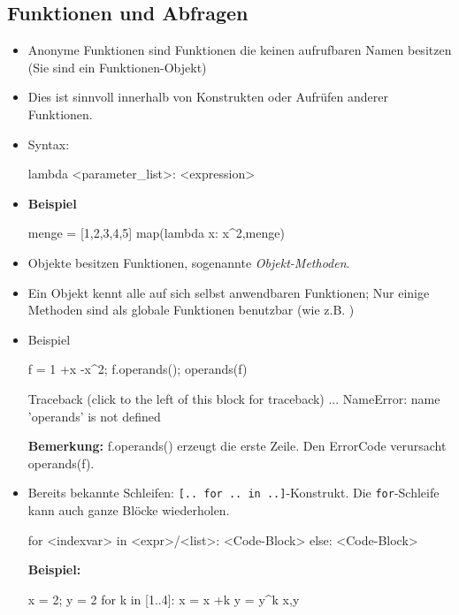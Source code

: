 \documentclass[fontsize=12pt,paper=a4,twoside,bibtotoc,idxtotoc,
liststotoc,pagesize,BCOR1.2cm,DIV15,chapterprefix,pagesize=pdftex]{scrbook}
\begin{document}
\subsection{Funktionen und Abfragen}
\begin{itemize}
\item Anonyme Funktionen sind Funktionen die keinen aufrufbaren Namen besitzen (Sie sind ein Funktionen-Objekt)
\item Dies ist sinnvoll innerhalb von Konstrukten oder Aufrüfen anderer Funktionen.
\item Syntax:
\begin{sagein}
lambda <parameter_list>: <expression> 
\end{sagein}
\item \textbf{Beispiel}
\begin{sagein}
menge = [1,2,3,4,5]
map(lambda x: x^2,menge)
\end{sagein}
\begin{sage}
 [1, 4, 9, 16, 25]
\end{sage}
\item Objekte besitzen Funktionen, sogenannte \emph{Objekt-Methoden}. 
\item Ein Objekt kennt alle auf sich selbst anwendbaren Funktionen; Nur einige Methoden sind als globale Funktionen benutzbar (wie z.B. )\newpage
\item Beispiel
 \begin{sagein}
f = 1 +x -x^2; f.operands(); operands(f)
\end{sagein}
\begin{sage}
[-x^2, x, 1]
Traceback (click to the left of this block for traceback)
...
NameError: name 'operands' is not defined
\end{sage}
\textbf{Bemerkung:}\newline
 f.operands() erzeugt die erste Zeile.\newline
 Den ErrorCode verursacht operands(f).
\item Bereits bekannte Schleifen: \verb+[.. for .. in ..]+-Konstrukt. Die \verb+for+-Schleife kann  auch
ganze Blöcke wiederholen.
\begin{sagein}
for <indexvar> in <expr>/<list>:
    <Code-Block>
else:
    <Code-Block>
\end{sagein}
\textbf{Beispiel:}
\begin{sagein}
x = 2; y = 2
for k in [1..4]:
    x = x +k
    y = y^k
x,y
\end{sagein}
\begin{sage}

\end{sage}
\end{itemize}
\end{document}
